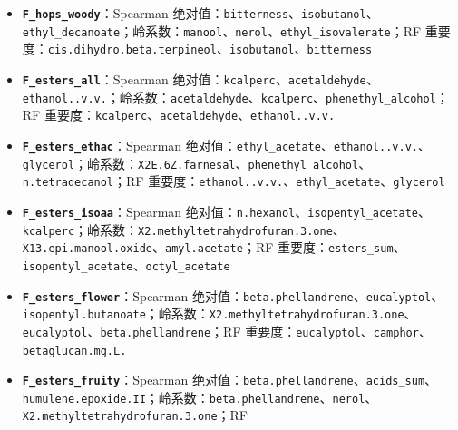 \documentclass[
  11pt,
]{ctexart}
\begin{document}
\begin{itemize}
\item
  \textbf{\texttt{F\_\allowbreak{}hops\_\allowbreak{}woody}}：Spearman
  绝对值：\texttt{bitterness}、\texttt{isobutanol}、\texttt{ethyl\_\allowbreak{}decanoate}；岭系数：\texttt{manool}、\texttt{nerol}、\texttt{ethyl\_\allowbreak{}isovalerate}；RF
  重要度：\texttt{cis.\allowbreak{}dihydro.\allowbreak{}beta.\allowbreak{}terpineol}、\texttt{isobutanol}、\texttt{bitterness}
\item
  \textbf{\texttt{F\_\allowbreak{}esters\_\allowbreak{}all}}：Spearman
  绝对值：\texttt{kcalperc}、\texttt{acetaldehyde}、\texttt{ethanol..v.v.}；岭系数：\texttt{acetaldehyde}、\texttt{kcalperc}、\texttt{phenethyl\_\allowbreak{}alcohol}；RF
  重要度：\texttt{kcalperc}、\texttt{acetaldehyde}、\texttt{ethanol..v.v.}
\item
  \textbf{\texttt{F\_\allowbreak{}esters\_\allowbreak{}ethac}}：Spearman
  绝对值：\texttt{ethyl\_\allowbreak{}acetate}、\texttt{ethanol..v.v.}、\texttt{glycerol}；岭系数：\texttt{X2E.\allowbreak{}6Z.\allowbreak{}farnesal}、\texttt{phenethyl\_\allowbreak{}alcohol}、\texttt{n.\allowbreak{}tetradecanol}；RF
  重要度：\texttt{ethanol..v.v.}、\texttt{ethyl\_\allowbreak{}acetate}、\texttt{glycerol}
\item
  \textbf{\texttt{F\_\allowbreak{}esters\_\allowbreak{}isoaa}}：Spearman
  绝对值：\texttt{n.hexanol}、\texttt{isopentyl\_\allowbreak{}acetate}、\texttt{kcalperc}；岭系数：\texttt{X2.\allowbreak{}methyltetrahydrofuran.\allowbreak{}3.\allowbreak{}one}、\texttt{X13.\allowbreak{}epi.\allowbreak{}manool.\allowbreak{}oxide}、\texttt{amyl.acetate}；RF
  重要度：\texttt{esters\_sum}、\texttt{isopentyl\_\allowbreak{}acetate}、\texttt{octyl\_\allowbreak{}acetate}
\item
  \textbf{\texttt{F\_\allowbreak{}esters\_\allowbreak{}flower}}：Spearman
  绝对值：\texttt{beta.\allowbreak{}phellandrene}、\texttt{eucalyptol}、\texttt{isopentyl.\allowbreak{}butanoate}；岭系数：\texttt{X2.\allowbreak{}methyltetrahydrofuran.\allowbreak{}3.\allowbreak{}one}、\texttt{eucalyptol}、\texttt{beta.\allowbreak{}phellandrene}；RF
  重要度：\texttt{eucalyptol}、\texttt{camphor}、\texttt{betaglucan.\allowbreak{}mg.\allowbreak{}L.\allowbreak{}}
\item
  \textbf{\texttt{F\_\allowbreak{}esters\_\allowbreak{}fruity}}：Spearman
  绝对值：\texttt{beta.\allowbreak{}phellandrene}、\texttt{acids\_sum}、\texttt{humulene.\allowbreak{}epoxide.\allowbreak{}II}；岭系数：\texttt{beta.\allowbreak{}phellandrene}、\texttt{nerol}、\texttt{X2.\allowbreak{}methyltetrahydrofuran.\allowbreak{}3.\allowbreak{}one}；RF

\end{itemize}
\end{document}

